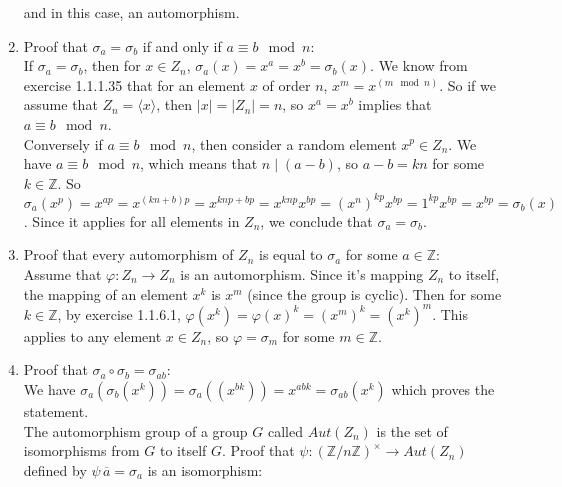 \documentclass[12pt]{article}
\newcommand{\Z}{\mathbb{Z}}
\newcommand{\olsi}[1]{\,\overline{\!{#1}}}
\begin{document}
\begin{enumerate}[label=\textbf{\alph*.}]
            and in this case, an automorphism.
        \item
            Proof that $\sigma_a = \sigma_b$
            if and only if $a \equiv b \mod n$: \\
            If $\sigma_a = \sigma_b$,
            then for $x \in Z_n$,
            $\sigma_a(x) = x^a = x^b = \sigma_b(x)$.
            We know from exercise 1.1.1.35 that for an element $x$ of
            order $n$, $x^m = x^{(m \mod n)}$.
            So if we assume that $Z_n = \langle x \rangle$,
            then $|x| = |Z_n| = n$,
            so $x^a = x^b$
            implies that $a \equiv b \mod n$. \\
            Conversely if $a \equiv b \mod n$,            
            then consider a random element $x^p \in Z_n$.
            We have $a \equiv b \mod n$,
            which means that $n \mid (a - b)$,
            so $a - b = kn$ for some $k \in \Z$.
            So $\sigma_a(x^p) = x^{ap}
            = x^{(kn + b)p}
            = x^{knp + bp}
            = x^{knp}x^{bp}
            = (x^n)^{kp}x^{bp}
            = 1^{kp}x^{bp}
            = x^{bp}
            = \sigma_b(x)$.
            Since it applies for all elements in $Z_n$,
            we conclude that $\sigma_a = \sigma_b$.
        \item
            Proof that every automorphism of $Z_n$ is equal
            to $\sigma_a$ for some $a \in \Z$: \\
            Assume that $\varphi:Z_n \to Z_n$ is an automorphism.
            Since it's mapping $Z_n$ to itself,
            the mapping of an element $x^k$ is $x^m$
            (since the group is cyclic).
            Then for some $k \in \Z$,
            by exercise 1.1.6.1,
            $\varphi(x^k) = \varphi(x)^k = (x^m)^k = (x^k)^m$.
            This applies to any element $x \in Z_n$,
            so $\varphi = \sigma_m$ for some $m \in \Z$. 
        \item
            Proof that $\sigma_a \circ \sigma_b = \sigma_{ab}$: \\
            We have $\sigma_a(\sigma_b(x^k))
            = \sigma_a((x^{bk}))
            = x^{abk}
            = \sigma_{ab}(x^k)$
            which proves the statement. \\
            The automorphism group of a group $G$ called $Aut(Z_n)$
            is the set of isomorphisms from $G$ to itself $G$.
            Proof that $\psi: (\Z/n\Z)^\times \to Aut(Z_n)$
            defined by $\psi{\olsi{a}} = \sigma_a$ is an isomorphism: \\

\end{enumerate}
\end{document}

